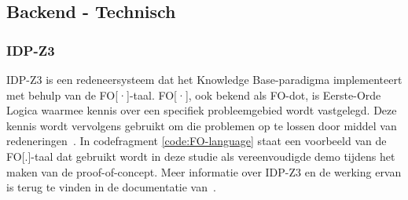 \subsection{Backend - Technisch}
\subsubsection{IDP-Z3}
IDP-Z3 is een redeneersysteem dat het Knowledge Base-paradigma implementeert met behulp van de FO[·]-taal. FO[·], ook bekend als FO-dot, is Eerste-Orde Logica waarmee kennis over een specifiek probleemgebied wordt vastgelegd. Deze kennis wordt vervolgens gebruikt om die problemen op te lossen door middel van redeneringen~\autocite{Carbonnelle2024}. In codefragment \ref{code:FO-language}  staat een voorbeeld van de FO[.]-taal dat  gebruikt wordt in deze studie als vereenvoudigde demo tijdens het maken van de proof-of-concept. Meer informatie over IDP-Z3 en de werking ervan is terug te vinden in de documentatie van~\textcite{Carbonnelle2024}.

